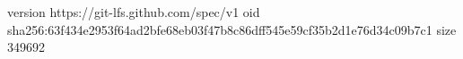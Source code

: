 version https://git-lfs.github.com/spec/v1
oid sha256:63f434e2953f64ad2bfe68eb03f47b8c86dff545e59cf35b2d1e76d34c09b7c1
size 349692
